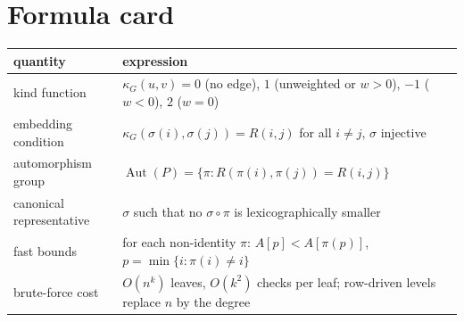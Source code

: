 \documentclass[11pt,a4paper]{article}
\newcommand{\Aut}{\operatorname{Aut}}
\begin{document}
\section{Formula card}

\begin{center}
\begin{tabular}{@{}ll@{}}
\toprule
quantity & expression \\
\midrule
kind function & $\kappa_G(u,v)=0$ (no edge), $1$ (unweighted or $w>0$), $-1$ ($w<0$), $2$ ($w=0$) \\
embedding condition & $\kappa_G(\sigma(i),\sigma(j))=R(i,j)$ for all $i\ne j$, $\sigma$ injective \\
automorphism group & $\Aut(P)=\{\pi : R(\pi(i),\pi(j))=R(i,j)\}$ \\
canonical representative & $\sigma$ such that no $\sigma\circ\pi$ is lexicographically smaller \\
fast bounds & for each non-identity $\pi$: $A[p]<A[\pi(p)]$, $p=\min\{i:\pi(i)\ne i\}$ \\
brute-force cost & $O(n^k)$ leaves, $O(k^2)$ checks per leaf; row-driven levels replace $n$ by the degree \\
\bottomrule
\end{tabular}
\end{center}
\end{document}
